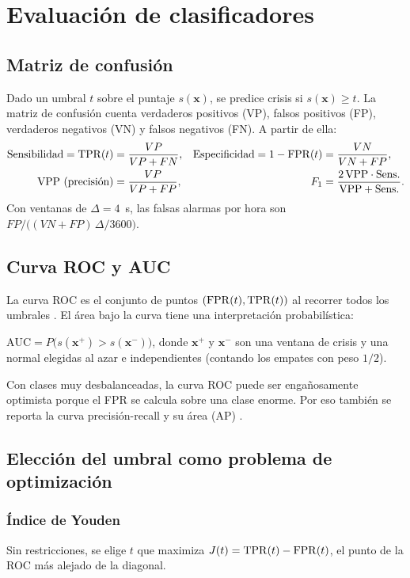 \chapter{Evaluación de clasificadores}
\label{cap:evaluacion}

\section{Matriz de confusión}

Dado un umbral $t$ sobre el puntaje $s(\bm x)$, se predice crisis si $s(\bm x)\ge t$. La matriz de confusión cuenta verdaderos positivos (VP), falsos positivos (FP), verdaderos negativos (VN) y falsos negativos (FN). A partir de ella:
\begin{align}
\text{Sensibilidad} = \mathrm{TPR}(t) &= \frac{VP}{VP+FN}, &
\text{Especificidad} = 1-\mathrm{FPR}(t) &= \frac{VN}{VN+FP},\\
\text{VPP (precisión)} &= \frac{VP}{VP+FP}, &
F_1 &= \frac{2\,\text{VPP}\cdot\text{Sens.}}{\text{VPP}+\text{Sens.}}.
\end{align}
Con ventanas de $\Delta = 4$~s, las falsas alarmas por hora son $FP / \big((VN+FP)\,\Delta/3600\big)$.

\section{Curva ROC y AUC}

La curva ROC es el conjunto de puntos $(\mathrm{FPR}(t), \mathrm{TPR}(t))$ al recorrer todos los umbrales \parencite{fawcett2006}. El área bajo la curva tiene una interpretación probabilística:
\begin{proposicion}
$\mathrm{AUC} = P\big(s(\bm x^+) > s(\bm x^-)\big)$, donde $\bm x^+$ y $\bm x^-$ son una ventana de crisis y una normal elegidas al azar e independientes (contando los empates con peso $1/2$).
\end{proposicion}

Con clases muy desbalanceadas, la curva ROC puede ser engañosamente optimista porque el FPR se calcula sobre una clase enorme. Por eso también se reporta la curva precisión-recall y su área (AP) \parencite{saito2015}.

\section{Elección del umbral como problema de optimización}

\subsection{Índice de Youden}
Sin restricciones, se elige $t$ que maximiza $J(t) = \mathrm{TPR}(t) - \mathrm{FPR}(t)$, el punto de la ROC más alejado de la diagonal.

